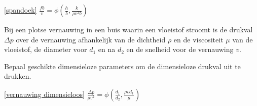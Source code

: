 \begin{antwoord}{\ref{spandoek}}
	$\frac{fb}{v} = \phi\left( \frac{h}{b},\frac{k}{\rho v^2 b} \right)$
\end{antwoord}
\begin{toepassing}
	\label{vernauwing dimensieloos}
Bij een plotse vernauwing in een buis waarin een vloeistof stroomt is de drukval $\Delta p$ over de vernauwing afhankelijk van de dichtheid $\rho$ en de viscositeit $\mu$ van de vloeistof, de diameter voor $d_1$ en na $d_2$ en de snelheid voor de vernauwing $v$.

Bepaal geschikte dimensieloze parameters om de dimensieloze drukval uit te drukken. 
\end{toepassing}
\begin{antwoord}{\ref{vernauwing dimensieloos}}
	$\frac{\Delta p}{\rho v^2} = \phi\left( \frac{d_1}{d_2},\frac{\rho v d_1}{\mu} \right)$
\end{antwoord}